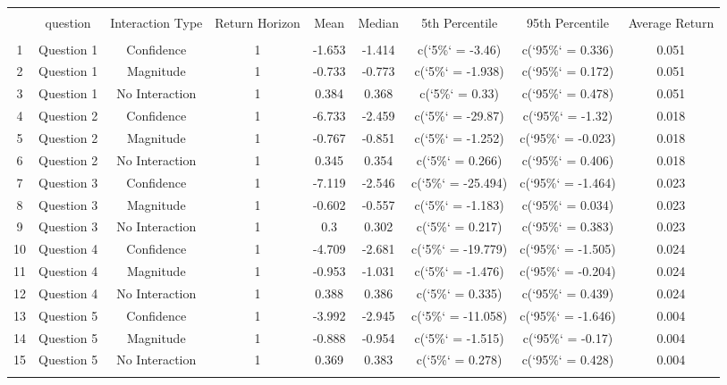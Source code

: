 
\begin{table}[!htbp] \centering 
  \caption{} 
  \label{} 
\begin{tabular}{@{\extracolsep{5pt}} ccccccccc} 
\\[-1.8ex]\hline 
\hline \\[-1.8ex] 
 & question & Interaction Type & Return Horizon & Mean & Median & 5th Percentile & 95th Percentile & Average Return \\ 
\hline \\[-1.8ex] 
1 & Question 1 & Confidence & 1 & -1.653 & -1.414 & c(`5\%` = -3.46) & c(`95\%` = 0.336) & 0.051 \\ 
2 & Question 1 & Magnitude & 1 & -0.733 & -0.773 & c(`5\%` = -1.938) & c(`95\%` = 0.172) & 0.051 \\ 
3 & Question 1 & No Interaction & 1 & 0.384 & 0.368 & c(`5\%` = 0.33) & c(`95\%` = 0.478) & 0.051 \\ 
4 & Question 2 & Confidence & 1 & -6.733 & -2.459 & c(`5\%` = -29.87) & c(`95\%` = -1.32) & 0.018 \\ 
5 & Question 2 & Magnitude & 1 & -0.767 & -0.851 & c(`5\%` = -1.252) & c(`95\%` = -0.023) & 0.018 \\ 
6 & Question 2 & No Interaction & 1 & 0.345 & 0.354 & c(`5\%` = 0.266) & c(`95\%` = 0.406) & 0.018 \\ 
7 & Question 3 & Confidence & 1 & -7.119 & -2.546 & c(`5\%` = -25.494) & c(`95\%` = -1.464) & 0.023 \\ 
8 & Question 3 & Magnitude & 1 & -0.602 & -0.557 & c(`5\%` = -1.183) & c(`95\%` = 0.034) & 0.023 \\ 
9 & Question 3 & No Interaction & 1 & 0.3 & 0.302 & c(`5\%` = 0.217) & c(`95\%` = 0.383) & 0.023 \\ 
10 & Question 4 & Confidence & 1 & -4.709 & -2.681 & c(`5\%` = -19.779) & c(`95\%` = -1.505) & 0.024 \\ 
11 & Question 4 & Magnitude & 1 & -0.953 & -1.031 & c(`5\%` = -1.476) & c(`95\%` = -0.204) & 0.024 \\ 
12 & Question 4 & No Interaction & 1 & 0.388 & 0.386 & c(`5\%` = 0.335) & c(`95\%` = 0.439) & 0.024 \\ 
13 & Question 5 & Confidence & 1 & -3.992 & -2.945 & c(`5\%` = -11.058) & c(`95\%` = -1.646) & 0.004 \\ 
14 & Question 5 & Magnitude & 1 & -0.888 & -0.954 & c(`5\%` = -1.515) & c(`95\%` = -0.17) & 0.004 \\ 
15 & Question 5 & No Interaction & 1 & 0.369 & 0.383 & c(`5\%` = 0.278) & c(`95\%` = 0.428) & 0.004 \\ 
\hline \\[-1.8ex] 
\end{tabular} 
\end{table} 
